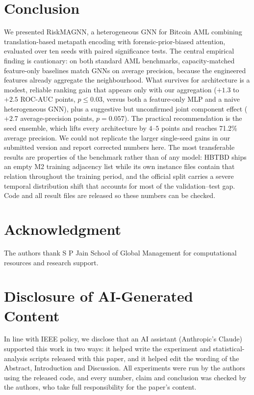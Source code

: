 \documentclass[conference]{IEEEtran}
\begin{document}
\section{Conclusion}

We presented RiskMAGNN, a heterogeneous GNN for Bitcoin AML combining
translation-based metapath encoding with forensic-prior-biased attention,
evaluated over ten seeds with paired significance tests. The central
empirical finding is cautionary: on both standard AML benchmarks,
capacity-matched feature-only baselines match GNNs on average precision,
because the engineered features already aggregate the neighbourhood. What
survives for architecture is a modest, reliable ranking gain that appears
only with our aggregation ($+1.3$ to $+2.5$ ROC-AUC points, $p\le0.03$,
versus both a feature-only MLP and a naive heterogeneous GNN),
plus a suggestive but unconfirmed joint component effect ($+2.7$
average-precision points, $p=0.057$). The practical recommendation is the
seed ensemble, which lifts every architecture by $4$--$5$ points and reaches
71.2\% average precision. We could not replicate the larger single-seed gains
in our submitted version and report corrected numbers here. The most
transferable results are properties of the benchmark rather than of any
model: HBTBD ships an empty M2 training adjacency list while its own instance
files contain that relation throughout the training period, and the official
split carries a severe temporal distribution shift that accounts for most of
the validation--test gap. Code and all result files are released so these
numbers can be checked.

\section*{Acknowledgment}

The authors thank S P Jain School of Global Management for computational
resources and research support.

\section*{Disclosure of AI-Generated Content}

In line with IEEE policy, we disclose that an AI assistant (Anthropic's
Claude) supported this work in two ways: it helped write the experiment and
statistical-analysis scripts released with this paper, and it helped edit the
wording of the Abstract, Introduction and Discussion. All experiments were
run by the authors using the released code, and every number, claim and
conclusion was checked by the authors, who take full responsibility for the
paper's content.
\end{document}
